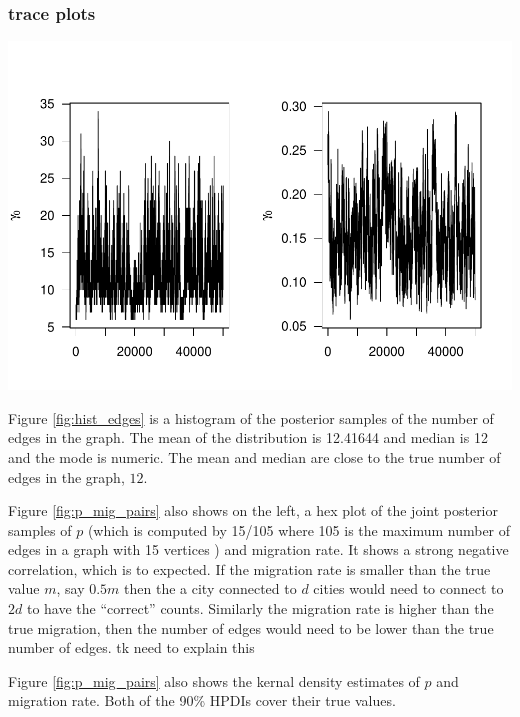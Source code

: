 \documentclass[11pt,a4paper]{article}
\numberwithin{equation}{section}
\begin{document}
\hypertarget{trace-plots}{%
\subsubsection{trace plots}\label{trace-plots}}

\includegraphics{thesis_draft_files/figure-latex/unnamed-chunk-10-1.pdf}

Figure \ref{fig:hist_edges} is a histogram of the posterior samples of
the number of edges in the graph. The mean of the distribution is
12.41644 and median is 12 and the mode is numeric. The mean and median
are close to the true number of edges in the graph, \(12\).

Figure \ref{fig:p_mig_pairs} also shows on the left, a hex plot of the
joint posterior samples of \(p\) (which is computed by 15/105 where 105
is the maximum number of edges in a graph with 15 vertices ) and
migration rate. It shows a strong negative correlation, which is to
expected. If the migration rate is smaller than the true value \(m\),
say \(0.5m\) then the a city connected to \(d\) cities would need to
connect to \(2d\) to have the ``correct'' counts. Similarly the
migration rate is higher than the true migration, then the number of
edges would need to be lower than the true number of edges. tk need to
explain this

Figure \ref{fig:p_mig_pairs} also shows the kernal density estimates of
\(p\) and migration rate. Both of the 90\% HPDIs cover their true
values.
\end{document}
